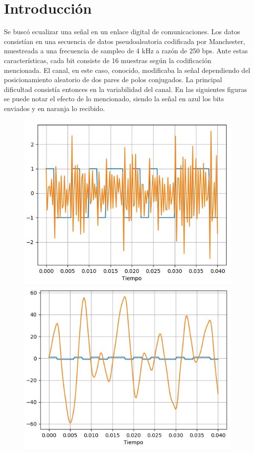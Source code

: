 \documentclass[main.tex]{subfiles}
\begin{document}
\begin{abstract}
\end{abstract}


\section{Introducción}
Se buscó ecualizar una señal en un enlace digital de comunicaciones. 
Los datos consistían en una secuencia de datos pseudoaleatoria 
codificada por Manchester, muestreada a una frecuencia de sampleo
 de 4 kHz a razón de 250 bps. Ante estas características, cada bit consiste de 
 16 muestras según la codificación mencionada. El canal, en este caso, conocido, 
 modificaba la señal dependiendo del posicionamiento
 aleatorio de dos pares de polos conjugados.
La principal dificultad consistía entonces en la variabilidad del canal. En las 
siguientes figuras se puede notar el efecto de lo mencionado, siendo la 
señal en azul los bits enviados y en naranja lo recibido. \newline
{}
\begin{figure}[H]
    \centering
    \includegraphics[scale=0.5]{imagenes/1.jpeg}\\
    \includegraphics[scale=0.5]{imagenes/2.jpeg}
\end{figure}
\end{document}
